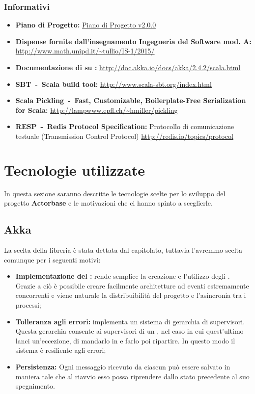\documentclass{scalatekids-article}
\begin{document}
\subsubsection{Informativi}

\begin{itemize}
\item\textbf{Piano di Progetto:}
  \href{run:./PianoDiProgetto\_v2.0.0.pdf}{Piano di Progetto v2.0.0}
\item\textbf{Dispense fornite dall'insegnamento Ingegneria del Software mod.
    A:}\\   \url{http://www.math.unipd.it/~tullio/IS-1/2015/}
\item\textbf{Documentazione di  su :}
  \url{http://doc.akka.io/docs/akka/2.4.2/scala.html}
\item\textbf{SBT\ -\ Scala build tool:}
  \url{http://www.scala-sbt.org/index.html}
\item\textbf{Scala Pickling\ -\ Fast, Customizable, Boilerplate-Free Serialization for Scala:}
  \url{http://lampwww.epfl.ch/~hmiller/pickling}
\item\textbf{RESP\ -\ Redis Protocol Specification:} Protocollo di comunicazione testuale  (Transmission Control Protocol)
  \url{http://redis.io/topics/protocol}
\end{itemize}

\newpage

\section{Tecnologie utilizzate}

In questa sezione saranno descritte le tecnologie scelte per lo sviluppo del
progetto \textbf{Actorbase} e le motivazioni che ci hanno spinto a sceglierle.

\subsection{Akka}

La scelta della libreria  è stata dettata dal capitolato, tuttavia
l'avremmo scelta comunque per i seguenti motivi:
\begin{itemize}
\item\textbf{Implementazione del :} 
  rende semplice la creazione e l'utilizzo degli . Grazie a ciò è
  possibile creare facilmente architetture ad eventi estremamente concorrenti e
  viene naturale la distribuibilità del progetto e l'asincronia tra i processi;
\item\textbf{Tolleranza agli errori:}  implementa un sistema di
  gerarchia di supervisori. Questa gerarchia consente ai supervisori di un
  , nel caso in cui quest'ultimo lanci un'eccezione, di mandarlo
  in  e farlo poi ripartire. In questo modo il sistema è resiliente
  agli errori;
\item\textbf{Persistenza:} Ogni messaggio ricevuto da ciascun 
  può essere salvato in maniera tale che al riavvio esso possa riprendere dallo
  stato precedente al suo spegnimento.
\end{itemize}
\end{document}
